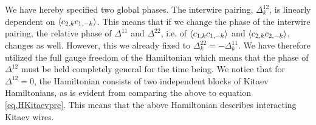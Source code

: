 We have hereby specified two global phases. The interwire pairing, $\Delta^{12}_k$, is linearly dependent on $\braket{c_{2,k}c_{1,-k}}$. This means that if we change the phase of the interwire pairing, the relative phase of $\Delta^{11}$ and $\Delta^{22}$, i.e. of $\braket{c_{1,k}c_{1,-k}}$ and $\braket{c_{2,k}c_{2,-k}}$, changes as well. However, this we already fixed to $\Delta^{22}_k = - \Delta^{11}_k$. We have therefore utilized the full gauge freedom of the Hamiltonian which means that the phase of $\Delta^{12}$ must be held completely general for the time being. We notice that for $\Delta^{12} = 0$, the Hamiltonian consists of two independent blocks of Kitaev Hamiltonians, as is evident from comparing the above to equation \ref{eq.HKitaevpre}. This means that the above Hamiltonian describes interacting Kitaev wires. 

